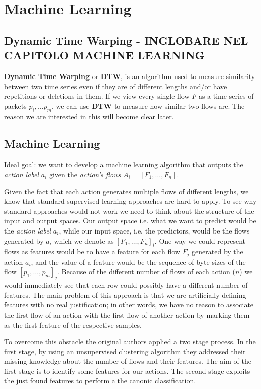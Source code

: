 \documentclass[a4paper,10pt]{scrartcl}
\begin{document}
\section{Machine Learning}
\label{sec:ml}


\subsection{Dynamic Time Warping - INGLOBARE NEL CAPITOLO MACHINE LEARNING}
\textbf{Dynamic Time Warping} or \textbf{DTW}, is an algorithm used to measure similarity between two time series even if they are of different lengths and/or have repetitions or deletions in them. If we view every single flow $F$ as a time series of packets $p_i,\dots p_m$, we can use \textbf{DTW} to measure how similar two flows are. The reason we are interested in this will become clear later.

\subsection{Machine Learning}
Ideal goal: we want to develop a machine learning algorithm that outputs the \textit{action label} $a_i$ given the \textit{action's flows} $A_i = [F_1,\dots, F_n]$.

Given the fact that each action generates multiple flows of different lengths, we know that standard supervised learning approaches are hard to apply. To see why standard approaches would not work we need to think about the structure of the input and output spaces. Our output space i.e. what we want to predict would be the \textit{action label} $a_i$, while our input space, i.e. the predictors, would be the flows generated by $a_i$ which we denote as $[F_1,\dots,F_n]_i $. One way we could represent flows as features would be to have a feature for each flow $F_j$ generated by the action $a_i$, and the value of a feature would be the sequence of byte sizes of the flow $[p_1,\dots, p_m]_j$. Because of the different number of flows of each action ($n$) we would immediately see that each row could possibly have a different number of features. The main problem of this approach is that we are artificially defining features with no real justification; in other words, we have no reason to associate the first flow of an action with the first flow of another action by marking them as the first feature of the respective samples.

To overcome this obstacle the original authors applied a two stage process. In the first stage, by using an unsupervised clustering algorithm they addressed their missing knowledge about the number of flows and their features. The aim of the first stage is to identify some features for our actions. The second stage exploits the just found features to perform a the canonic classification.
\end{document}
